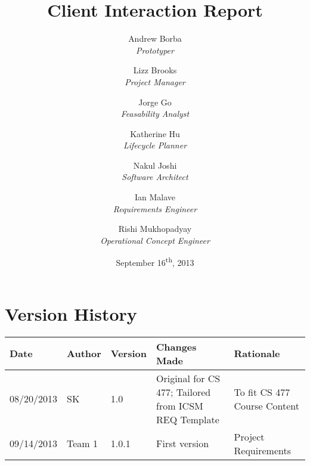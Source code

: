 \documentclass[titlepage]{article}
\title{Client Interaction Report}
\author{
	Andrew Borba\\ \emph{Prototyper}	\and
	 Lizz Brooks\\ \emph{Project Manager}	\and
	 Jorge Go\\ \emph{Feasability Analyst}	\and
	 Katherine Hu\\ \emph{Lifecycle Planner}	\and
	 Nakul Joshi\\ \emph{Software Architect}	\and
	 Ian Malave\\ \emph{Requirements Engineer}	\and
	 Rishi Mukhopadyay\\ \emph{Operational Concept Engineer}
}
\date{September 16\textsuperscript{th}, 2013}
\begin{document}
\pagestyle{fancy}
\chead{}
\lfoot{}
\cfoot{\thepage}
\rfoot{}

\maketitle
\tableofcontents
\newpage
\section{Version History}
\begin{table}[h]
	\centering
    \begin{tabularx}{\textwidth}{lllXX}
    	\hline
        Date       & Author & Version & Changes Made                                         & Rationale                    \\ \hline
        08/20/2013 & SK     & 1.0     & Original for CS 477; Tailored from ICSM REQ Template & To fit CS 477 Course Content \\ 
        09/14/2013 & Team 1 & 1.0.1   & First version                                                   & Project Requirements                          \\
		\hline
    \end{tabularx}
\end{table}
\newpage


		
\end{document}
